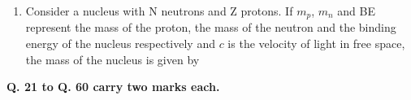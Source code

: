 \documentclass[14pt, a4paper]{extarticle}
\begin{document}
\begin{enumerate}[label=\textbf{Q. \arabic*}]
\item Consider a nucleus with N neutrons and Z protons. If $m_p$, $m_n$ and BE represent the mass of the proton, the mass of the neutron and the binding energy of the nucleus respectively and $c$ is the velocity of light in free space, the mass of the nucleus is given by
    \begin{enumerate}
    \end{enumerate}
\end{enumerate}

\vspace{1.5em}
\noindent 
\textbf{Q. 21 to Q. 60 carry two marks each.}
\vspace{1em}
\end{document}
